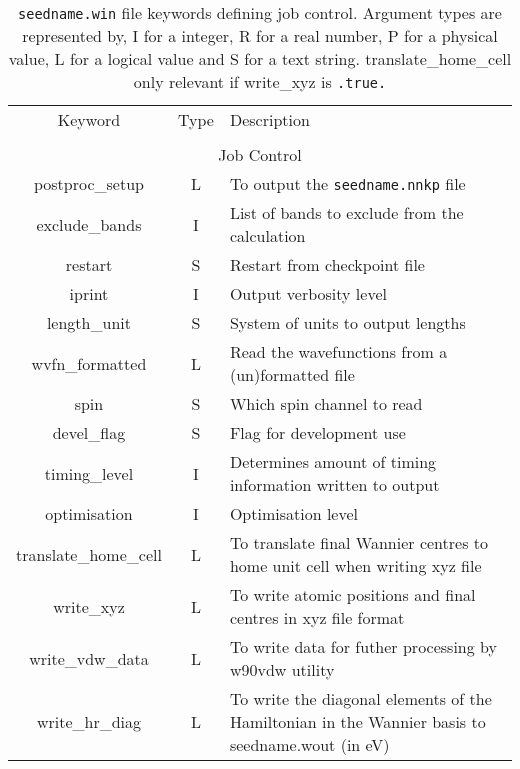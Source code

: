 \begin{table}
\begin{center}
\begin{tabular}{|c|c|p{6cm}|}
\hline
Keyword & Type & Description \\
        &      &             \\
\hline\hline
\multicolumn{3}{|c|}{Job Control} \\
\hline
{\sc postproc\_setup }   & L & To output the {\tt seedname.nnkp} file \\
{\sc exclude\_bands }   & I & List of bands to exclude from the calculation \\
{\sc restart }   & S & Restart from checkpoint file \\
{\sc iprint }   & I & Output verbosity level \\
{\sc length\_unit }   & S & System of units to output lengths \\
{\sc wvfn\_formatted }   & L & Read the wavefunctions from a  (un)formatted file  \\
{\sc spin }   & S & Which spin channel to read \\
{\sc devel\_flag }   & S & Flag for development use \\
{\sc timing\_level } & I & Determines amount of timing information
written to output \\
{\sc optimisation } & I & Optimisation level \\ 
{\sc translate\_home\_cell } & L & To translate final Wannier centres
to home unit cell when writing xyz file\\
{\sc write\_xyz }  & L & To write atomic positions and final centres in xyz file format \\
{\sc write\_vdw\_data }  & L & To write data for futher processing by w90vdw utility\\
{\sc write\_hr\_diag }  & L & To write the diagonal elements of
the Hamiltonian in the Wannier basis to seedname.wout (in eV)\\
\hline
\end{tabular}
\caption[win file keywords.]
{{\tt seedname.win} file keywords defining job control.  Argument types
are represented by, I for a integer, R for a real number, P for a
physical value, L for a logical value and S for a text string. {\sc
  translate\_home\_cell } only relevant if {\sc write\_xyz} is
\texttt{.true.}}
\label{parameter_keywords2}
\end{center}
\end{table}





